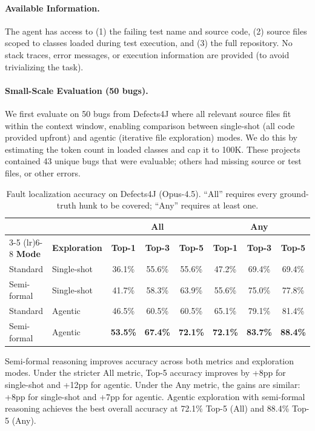\documentclass[]{meta}
\begin{document}
\paragraph{Available Information.} The agent has access to (1) the failing test name and source code, (2) source files scoped to classes loaded during test execution, and (3) the full repository. No stack traces, error messages, or execution information are provided (to avoid trivializing the task).

\paragraph{Small-Scale Evaluation (50 bugs).} We first evaluate on 50 bugs from Defects4J where all relevant source files fit within the context window, enabling comparison between single-shot (all code provided upfront) and agentic (iterative file exploration) modes.  We do this by estimating the token count in loaded classes and cap it to 100K.
These projects contained 43 unique bugs that were evaluable; others had missing source or test files, or other errors.

\begin{table}[h]
\centering
\caption{Fault localization accuracy on Defects4J (Opus-4.5). ``All'' requires every ground-truth hunk to be covered; ``Any'' requires at least one.}
\label{tab:fl-results}
\begin{tabular}{llcccccc}
\toprule
 & & \multicolumn{3}{c}{\textbf{All}} & \multicolumn{3}{c}{\textbf{Any}} \\
\cmidrule(lr){3-5} \cmidrule(lr){6-8}
\textbf{Mode} & \textbf{Exploration} & \textbf{Top-1} & \textbf{Top-3} & \textbf{Top-5} & \textbf{Top-1} & \textbf{Top-3} & \textbf{Top-5} \\
\midrule
Standard & Single-shot & 36.1\% & 55.6\% & 55.6\% & 47.2\% & 69.4\% & 69.4\% \\
Semi-formal & Single-shot & 41.7\% & 58.3\% & 63.9\% & 55.6\% & 75.0\% & 77.8\% \\
Standard & Agentic & 46.5\% & 60.5\% & 60.5\% & 65.1\% & 79.1\% & 81.4\% \\
Semi-formal & Agentic & \textbf{53.5\%} & \textbf{67.4\%} & \textbf{72.1\%} & \textbf{72.1\%} & \textbf{83.7\%} & \textbf{88.4\%} \\
\bottomrule
\end{tabular}
\end{table}

Semi-formal reasoning improves accuracy across both metrics and exploration modes. Under the stricter All metric, Top-5 accuracy improves by +8pp for single-shot and +12pp for agentic. Under the Any metric, the gains are similar: +8pp for single-shot and +7pp for agentic. Agentic exploration with semi-formal reasoning achieves the best overall accuracy at 72.1\% Top-5 (All) and 88.4\% Top-5 (Any).
\end{document}
